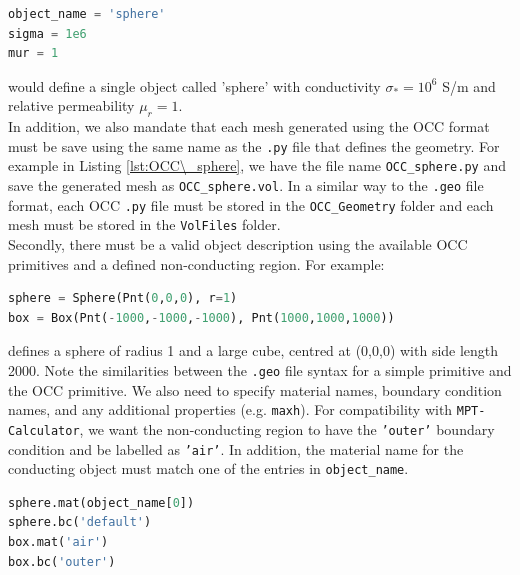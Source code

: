 \begin{lstlisting}[language=Python]
object_name = 'sphere'
sigma = 1e6
mur = 1
\end{lstlisting}
would define a single object called 'sphere' with conductivity $\sigma_*=10^6$ S/m and relative permeability $\mu_r = 1$.\\

\noindent
In addition, we also mandate that each mesh generated using the OCC format must be save using the same name as the \texttt{.py} file that defines the geometry. For example in Listing \ref{lst:OCC\_sphere}, we have the file name \texttt{OCC\_sphere.py} and save the generated mesh as \texttt{OCC\_sphere.vol}. In a similar way to the \texttt{.geo} file format, each OCC \texttt{.py} file must be stored in the \texttt{OCC\_Geometry} folder and each mesh must be stored in the \texttt{VolFiles} folder.\\

\noindent
Secondly, there must be a valid object description using the available OCC primitives and a defined non-conducting region. For example:
\begin{lstlisting}[language=Python]
sphere = Sphere(Pnt(0,0,0), r=1)
box = Box(Pnt(-1000,-1000,-1000), Pnt(1000,1000,1000))
\end{lstlisting}
defines a sphere of radius 1 and a large cube, centred at (0,0,0) with side length 2000. Note the similarities between the \texttt{.geo} file syntax for a simple primitive and the OCC primitive. We also need to specify material names, boundary condition names, and any additional properties (e.g. \texttt{𝚖𝚊𝚡𝚑}). For compatibility with \texttt{MPT-Calculator}, we want the non-conducting region to have the \texttt{'outer'} boundary condition and be labelled as \texttt{'air'}. In addition, the material name for the conducting object must match one of the entries in \texttt{object\_name}.

\begin{lstlisting}[language=Python]
sphere.mat(object_name[0])
sphere.bc('default')
box.mat('air')
box.bc('outer')
\end{lstlisting}


